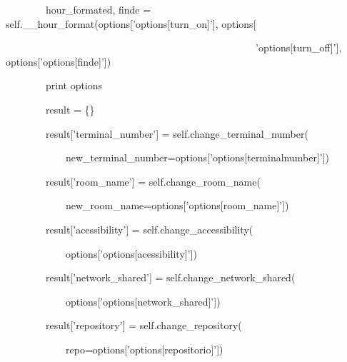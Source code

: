 {\ttfamily\color[rgb]{0.10980392,0.10980392,0.10980392}
    \ \ \ \ \ \ \ \ hour\_formated, finde = self.\_\_hour\_format(options['options[turn\_on]'], options[}

            {\ttfamily\color[rgb]{0.10980392,0.10980392,0.10980392}
            \ \ \ \ \ \ \ \ \ \ \ \ \ \ \ \ \ \ \ \ \ \ \ \ \ \ \ \ \ \ \ \ \ \ \ \ \ \ \ \ \ \ \ \ \ \ \ \ \ \ {}'options[turn\_off]'],
            options['options[finde]'])}

{\ttfamily\color[rgb]{0.10980392,0.10980392,0.10980392}
    \ \ \ \ \ \ \ \ print options}

{\ttfamily\color[rgb]{0.10980392,0.10980392,0.10980392}
    \ \ \ \ \ \ \ \ result = \{\}}

{\ttfamily\color[rgb]{0.10980392,0.10980392,0.10980392}
    \ \ \ \ \ \ \ \ result['terminal\_number'] = self.change\_terminal\_number(}

            {\ttfamily\color[rgb]{0.10980392,0.10980392,0.10980392}
            \ \ \ \ \ \ \ \ \ \ \ \ new\_terminal\_number=options['options[terminalnumber]'])}


    \bigskip

{\ttfamily\color[rgb]{0.10980392,0.10980392,0.10980392}
    \ \ \ \ \ \ \ \ result['room\_name'] = self.change\_room\_name(}

            {\ttfamily\color[rgb]{0.10980392,0.10980392,0.10980392}
            \ \ \ \ \ \ \ \ \ \ \ \ new\_room\_name=options['options[room\_name]'])}


    \bigskip

{\ttfamily\color[rgb]{0.10980392,0.10980392,0.10980392}
    \ \ \ \ \ \ \ \ result['acessibility'] = self.change\_accessibility(}

            {\ttfamily\color[rgb]{0.10980392,0.10980392,0.10980392}
            \ \ \ \ \ \ \ \ \ \ \ \ options['options[acessibility]'])}


    \bigskip

{\ttfamily\color[rgb]{0.10980392,0.10980392,0.10980392}
    \ \ \ \ \ \ \ \ result['network\_shared'] = self.change\_network\_shared(}

            {\ttfamily\color[rgb]{0.10980392,0.10980392,0.10980392}
            \ \ \ \ \ \ \ \ \ \ \ \ options['options[network\_shared]'])}


    \bigskip

{\ttfamily\color[rgb]{0.10980392,0.10980392,0.10980392}
    \ \ \ \ \ \ \ \ result['repository'] = self.change\_repository(}

            {\ttfamily\color[rgb]{0.10980392,0.10980392,0.10980392}
            \ \ \ \ \ \ \ \ \ \ \ \ repo=options['options[repositorio]'])}


